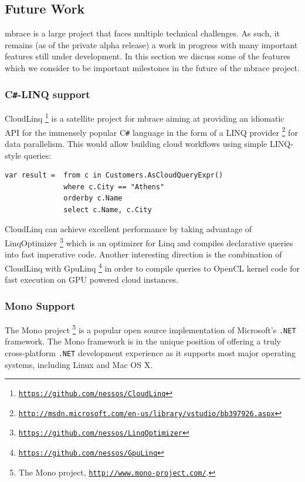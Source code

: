 \documentclass[9pt,a4paper]{article}
\newcommand{\mbrace}{mbrace}
\newcommand{\Mbrace}{\mbrace}
\newcommand{\csharp}{C\texttt \#}
\newcommand{\dotnet}{\texttt{\hbox{.}NET}}
\newcommand{\samehref}[1]{\href{#1}{\texttt{#1}}}
\begin{document}
\subsection*{Future Work}

\Mbrace{} is a large project that faces multiple technical challenges. As such,
it remains (as of the private alpha release) a work in progress with many important
features still under development. In this section we discuss some of the features
which we consider to be important milestones in the future of the \mbrace{} project.

\subsubsection*{\csharp{}-LINQ support}
CloudLinq%
\footnote{\samehref{https://github.com/nessos/CloudLinq}}
is a satellite project for \mbrace{} aiming at providing an idiomatic 
API for the immensely popular \csharp{} language in the
form of a LINQ provider%
\footnote{\samehref{http://msdn.microsoft.com/en-us/library/vstudio/bb397926.aspx}}
for data parallelism. This would allow building cloud workflows using simple
LINQ-style queries:
\begin{lstlisting}[language=CSharp]
var result =  from c in Customers.AsCloudQueryExpr()
              where c.City == "Athens"
              orderby c.Name
              select c.Name, c.City
\end{lstlisting}
CloudLinq can achieve excellent performance by taking advantage of LinqOptimizer%
\footnote{\samehref{https://github.com/nessos/LinqOptimizer}}
which is an optimizer for Linq and compiles declarative queries into fast imperative code. Another interesting direction is the combination
of CloudLinq with GpuLinq%
\footnote{\samehref{https://github.com/nessos/GpuLinq}}
in order to compile queries to OpenCL kernel code for fast execution on GPU powered cloud instances.

\subsubsection*{Mono Support}

The Mono project%
\footnote{The Mono project, \samehref{http://www.mono-project.com/}.}
is a popular open source implementation of Microsoft's \dotnet{} framework.
The Mono framework is in the unique position of offering a truly cross-platform
\dotnet{} development experience as it supports most major operating systems,
including Linux and Mac OS X.
\end{document}

